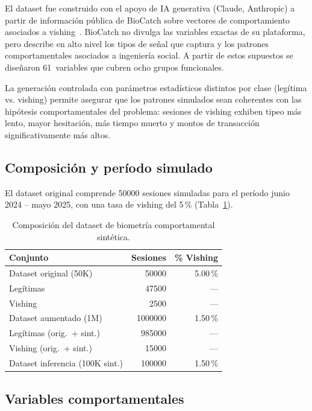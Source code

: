 \documentclass[journal]{IEEEtran}
\begin{document}
El dataset fue construido con el apoyo de IA generativa (Claude, Anthropic) a
partir de información pública de BioCatch sobre vectores de comportamiento
asociados a vishing~\cite{biocatch2022}. BioCatch no divulga las variables
exactas de su plataforma, pero describe en alto nivel los tipos de señal que
captura y los patrones comportamentales asociados a ingeniería social. A partir
de estos supuestos se diseñaron 61~variables que cubren ocho grupos
funcionales.

La generación controlada con parámetros estadísticos distintos por clase
(legítima vs. vishing) permite asegurar que los patrones simulados sean
coherentes con las hipótesis comportamentales del problema: sesiones de vishing
exhiben tipeo más lento, mayor hesitación, más tiempo muerto y montos de
transacción significativamente más altos.

\subsection{Composición y período simulado}

El dataset original comprende \num{50000} sesiones simuladas para el período
junio 2024 -- mayo 2025, con una tasa de vishing del 5\,\% (Tabla~\ref{tab:dataset}).

\begin{table}[h]
\caption{Composición del dataset de biometría comportamental sintética.}
\label{tab:dataset}
\centering
\begin{tabular}{lrr}
\toprule
\textbf{Conjunto} & \textbf{Sesiones} & \textbf{\% Vishing} \\
\midrule
Dataset original (50K)          & \num{50000}   & 5.00\,\% \\
\quad Legítimas                 & \num{47500}   & ---      \\
\quad Vishing                   & \num{2500}    & ---      \\
\midrule
Dataset aumentado (1M)          & \num{1000000} & 1.50\,\% \\
\quad Legítimas (orig.\ + sint.)& \num{985000}  & ---      \\
\quad Vishing (orig.\ + sint.)  & \num{15000}   & ---      \\
\midrule
Dataset inferencia (100K sint.) & \num{100000}  & 1.50\,\% \\
\bottomrule
\end{tabular}
\end{table}

\subsection{Variables comportamentales}
\end{document}
